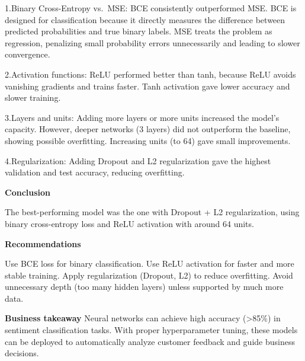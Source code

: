 \documentclass[
]{article}
\begin{document}
1.Binary Cross-Entropy vs.~MSE: BCE consistently outperformed MSE. BCE
is designed for classification because it directly measures the
difference between predicted probabilities and true binary labels. MSE
treats the problem as regression, penalizing small probability errors
unnecessarily and leading to slower convergence.

2.Activation functions: ReLU performed better than tanh, because ReLU
avoids vanishing gradients and trains faster. Tanh activation gave lower
accuracy and slower training.

3.Layers and units: Adding more layers or more units increased the
model's capacity. However, deeper networks (3 layers) did not outperform
the baseline, showing possible overfitting. Increasing units (to 64)
gave small improvements.

4.Regularization: Adding Dropout and L2 regularization gave the highest
validation and test accuracy, reducing overfitting.

\textbf{Conclusion}

The best-performing model was the one with Dropout + L2 regularization,
using binary cross-entropy loss and ReLU activation with around 64
units.

\textbf{Recommendations}

Use BCE loss for binary classification. Use ReLU activation for faster
and more stable training. Apply regularization (Dropout, L2) to reduce
overfitting. Avoid unnecessary depth (too many hidden layers) unless
supported by much more data.

\textbf{Business takeaway} Neural networks can achieve high accuracy
(\textgreater85\%) in sentiment classification tasks. With proper
hyperparameter tuning, these models can be deployed to automatically
analyze customer feedback and guide business decisions.
\end{document}
